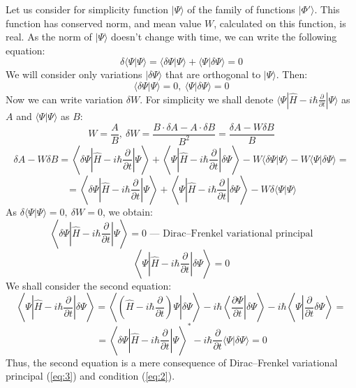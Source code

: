 Let us consider for simplicity function $|\Psi\rangle$ of the family of functions $|\Phi'\rangle$. 
This function has conserved norm, and mean value $W$, calculated on this function, is real.
As the norm of $|\Psi\rangle$ doesn't change with time, we can write the following equation:
$$\delta\langle\Psi|\Psi\rangle = \langle\delta\Psi|\Psi\rangle+\langle\Psi|\delta\Psi\rangle=0$$
We will consider only variations $|\delta\Psi\rangle$ that are orthogonal to $|\Psi\rangle$. Then:
\begin{equation}
\langle\delta\Psi|\Psi\rangle=0,\ \langle\Psi|\delta\Psi\rangle=0
\label{eq:2}
\end{equation}
Now we can write variation $\delta W$. 
For simplicity we shall denote $\langle\Psi|\hat{H}-i\hbar\frac{\partial}{\partial t}|\Psi\rangle$ as $A$ 
and $\langle\Psi|\Psi\rangle$ as $B$:
$$W = \frac{A}{B},\ \delta W = \frac{B\cdot\delta A - A\cdot\delta B}{B^2}=\frac{\delta A - W\delta B}{B}$$
$$\delta A - W\delta B = \left\langle\delta\Psi\left|\hat{H}-i\hbar\frac{\partial}{\partial t}\right|\Psi\right\rangle + %
			 \left\langle\Psi\left|\hat{H}-i\hbar\frac{\partial}{\partial t}\right|\delta\Psi\right\rangle - 
			 W\langle\delta\Psi|\Psi\rangle - W\langle\Psi|\delta\Psi\rangle = $$
$$ = \left\langle\delta\Psi\left|\hat{H}-i\hbar\frac{\partial}{\partial t}\right|\Psi\right\rangle + %
     \left\langle\Psi\left|\hat{H}-i\hbar\frac{\partial}{\partial t}\right|\delta\Psi\right\rangle - W\delta\langle\Psi|\Psi\rangle$$
As $\delta\langle\Psi|\Psi\rangle=0,\ \delta W = 0$, we obtain:
\begin{equation}
\left\langle\delta\Psi\left|\hat{H}-i\hbar\frac{\partial}{\partial t}\right|\Psi\right\rangle = 0\text{ --- Dirac--Frenkel variational principal}
\label{eq:3}
\end{equation}
$$\left\langle\Psi\left|\hat{H}-i\hbar\frac{\partial}{\partial t}\right|\delta\Psi\right\rangle = 0$$
We shall consider the second equation:
$$\left\langle\Psi\left|\hat{H}-i\hbar\frac{\partial}{\partial t}\right|\delta\Psi\right\rangle = %
  \left\langle\left.\left(\hat{H}-i\hbar\frac{\partial}{\partial t}\right)\Psi\right|\delta\Psi\right\rangle-%
  i\hbar\left.\left\langle\frac{\partial\Psi}{\partial t}\right|\delta\Psi\right\rangle-%
  i\hbar\left\langle\Psi\left|\frac{\partial}{\partial t}\delta\Psi\right\rangle\right.=$$
$$=\left\langle\delta\Psi\left|\hat{H}-i\hbar\frac{\partial}{\partial t}\right|\Psi\right\rangle^* -%
   i\hbar\frac{\partial}{\partial t}\langle\Psi|\delta\Psi\rangle = 0$$
Thus, the second equation is a mere consequence of Dirac--Frenkel variational principal (\ref{eq:3}) and condition (\ref{eq:2}).

